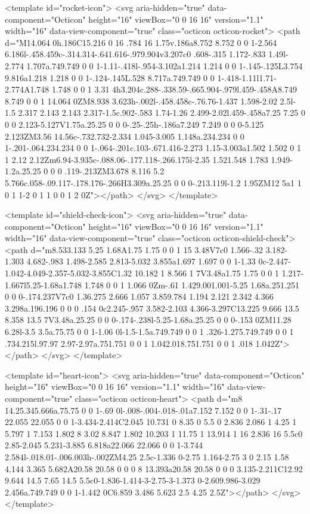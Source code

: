 <template id="rocket-icon">
  <svg aria-hidden="true" data-component="Octicon" height="16" viewBox="0 0 16 16" version="1.1" width="16" data-view-component="true" class="octicon octicon-rocket">
    <path d="M14.064 0h.186C15.216 0 16 .784 16 1.75v.186a8.752 8.752 0 0 1-2.564 6.186l-.458.459c-.314.314-.641.616-.979.904v3.207c0 .608-.315 1.172-.833 1.49l-2.774 1.707a.749.749 0 0 1-1.11-.418l-.954-3.102a1.214 1.214 0 0 1-.145-.125L3.754 9.816a1.218 1.218 0 0 1-.124-.145L.528 8.717a.749.749 0 0 1-.418-1.11l1.71-2.774A1.748 1.748 0 0 1 3.31 4h3.204c.288-.338.59-.665.904-.979l.459-.458A8.749 8.749 0 0 1 14.064 0ZM8.938 3.623h-.002l-.458.458c-.76.76-1.437 1.598-2.02 2.5l-1.5 2.317 2.143 2.143 2.317-1.5c.902-.583 1.74-1.26 2.499-2.02l.459-.458a7.25 7.25 0 0 0 2.123-5.127V1.75a.25.25 0 0 0-.25-.25h-.186a7.249 7.249 0 0 0-5.125 2.123ZM3.56 14.56c-.732.732-2.334 1.045-3.005 1.148a.234.234 0 0 1-.201-.064.234.234 0 0 1-.064-.201c.103-.671.416-2.273 1.15-3.003a1.502 1.502 0 1 1 2.12 2.12Zm6.94-3.935c-.088.06-.177.118-.266.175l-2.35 1.521.548 1.783 1.949-1.2a.25.25 0 0 0 .119-.213ZM3.678 8.116 5.2 5.766c.058-.09.117-.178.176-.266H3.309a.25.25 0 0 0-.213.119l-1.2 1.95ZM12 5a1 1 0 1 1-2 0 1 1 0 0 1 2 0Z"></path>
</svg>
</template>

<template id="shield-check-icon">
  <svg aria-hidden="true" data-component="Octicon" height="16" viewBox="0 0 16 16" version="1.1" width="16" data-view-component="true" class="octicon octicon-shield-check">
    <path d="m8.533.133 5.25 1.68A1.75 1.75 0 0 1 15 3.48V7c0 1.566-.32 3.182-1.303 4.682-.983 1.498-2.585 2.813-5.032 3.855a1.697 1.697 0 0 1-1.33 0c-2.447-1.042-4.049-2.357-5.032-3.855C1.32 10.182 1 8.566 1 7V3.48a1.75 1.75 0 0 1 1.217-1.667l5.25-1.68a1.748 1.748 0 0 1 1.066 0Zm-.61 1.429.001.001-5.25 1.68a.251.251 0 0 0-.174.237V7c0 1.36.275 2.666 1.057 3.859.784 1.194 2.121 2.342 4.366 3.298a.196.196 0 0 0 .154 0c2.245-.957 3.582-2.103 4.366-3.297C13.225 9.666 13.5 8.358 13.5 7V3.48a.25.25 0 0 0-.174-.238l-5.25-1.68a.25.25 0 0 0-.153 0ZM11.28 6.28l-3.5 3.5a.75.75 0 0 1-1.06 0l-1.5-1.5a.749.749 0 0 1 .326-1.275.749.749 0 0 1 .734.215l.97.97 2.97-2.97a.751.751 0 0 1 1.042.018.751.751 0 0 1 .018 1.042Z"></path>
</svg>
</template>

<template id="heart-icon">
  <svg aria-hidden="true" data-component="Octicon" height="16" viewBox="0 0 16 16" version="1.1" width="16" data-view-component="true" class="octicon octicon-heart">
    <path d="m8 14.25.345.666a.75.75 0 0 1-.69 0l-.008-.004-.018-.01a7.152 7.152 0 0 1-.31-.17 22.055 22.055 0 0 1-3.434-2.414C2.045 10.731 0 8.35 0 5.5 0 2.836 2.086 1 4.25 1 5.797 1 7.153 1.802 8 3.02 8.847 1.802 10.203 1 11.75 1 13.914 1 16 2.836 16 5.5c0 2.85-2.045 5.231-3.885 6.818a22.066 22.066 0 0 1-3.744 2.584l-.018.01-.006.003h-.002ZM4.25 2.5c-1.336 0-2.75 1.164-2.75 3 0 2.15 1.58 4.144 3.365 5.682A20.58 20.58 0 0 0 8 13.393a20.58 20.58 0 0 0 3.135-2.211C12.92 9.644 14.5 7.65 14.5 5.5c0-1.836-1.414-3-2.75-3-1.373 0-2.609.986-3.029 2.456a.749.749 0 0 1-1.442 0C6.859 3.486 5.623 2.5 4.25 2.5Z"></path>
</svg>
</template>

